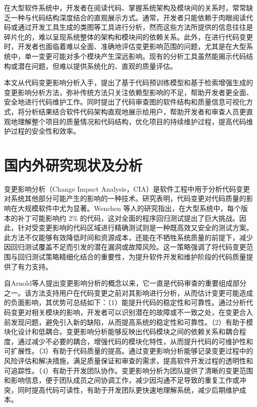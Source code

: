在大型软件系统中，开发者在阅读代码、掌握系统架构及模块间的关系时，常常缺乏一种与代码结构深度结合的直观展示方式。通常，开发者只能依赖于肉眼阅读代码或通过开发工具生成的类图等工具进行分析，然而这些方法所提供的信息往往是碎片化的，难以呈现系统整体的架构和模块间的依赖关系。此外，在进行代码变更时，开发者也面临着难以全面、准确地评估变更影响范围的问题，尤其是在大型系统中，单一变更可能对多个模块产生深远影响。现有的分析工具虽然能揭示代码结构或潜在问题，但难以提供系统化的、直观的质量评估。

本文从代码变更影响分析入手，提出了基于代码预训练模型和基于检索增强生成的变更影响分析方法，弥补传统方法只关注依赖型影响的不足，帮助开发者更全面、安全地进行代码维护工作。同时提出了代码审查图的软件结构和质量信息可视化方式，将分析结果结合软件代码架构直观地展示给用户，帮助开发者和审查人员更直观地理解整个项目的质量情况和代码结构，优化项目的持续维护过程，提高代码维护过程的安全性和效率。


\section{国内外研究现状及分析}

变更影响分析（Change Impact Analysis，CIA）是软件工程中用于分析代码变更对系统其他部分可能产生的影响的一种技术。研究表明，代码变更对代码质量的影响在大规模软件中尤为显著。Wenchen 等人的研究指出\cite{2013Large}，在大型系统中，每个版本的补丁可能影响约 2\% 的代码，这对全面的程序回归测试提出了巨大挑战。因此，针对受变更影响的代码区域进行精确测试则是一种既高效又安全的测试方案。此方法不仅能够有效降低时间和资源成本，还能在不牺牲系统质量的前提下，减少因回归测试覆盖不足而引发的潜在漏洞或故障风险。这一策略强调了将代码变更范围与回归测试策略精细化结合的重要性，为提升软件开发和维护阶段的代码质量提供了有力支持。

自Arnold等人\cite{Arnold1996}提出变更影响分析的概念以来，它一直是代码审查的重要组成部分之一。该方法支持用户在代码变更之前对其影响进行分析，从而估计变更可能造成的负面影响，其优势可总结如下：（1）能提升代码的稳定性和可靠性\cite{KRETSOU2021110892}。通过分析代码变更对相关模块的影响，开发者可以识别潜在的故障或不一致之处，在变更合入前发现问题，避免引入新的缺陷，从而提高系统的稳定性和可靠性。（2）有助于模块化设计和低耦合。变更影响分析能够反映出代码模块之间的依赖关系和耦合程度，通过减少不必要的耦合，增强代码的模块化特性，从而提升代码的可维护性和可扩展性。（3）有助于代码质量的提高。通过变更影响分析能够记录变更过程中的风险评估和解决措施，满足质量保证和审查的需求，提高软件开发过程的透明性和可追踪性。（4）有助于开发团队协作。变更影响分析为团队提供了清晰的变更范围和影响信息，便于团队成员之间协调工作，减少因沟通不足导致的重复工作或冲突，同时提高代码可读性，有助于开发团队更快速地理解系统，减少后期维护成本。


